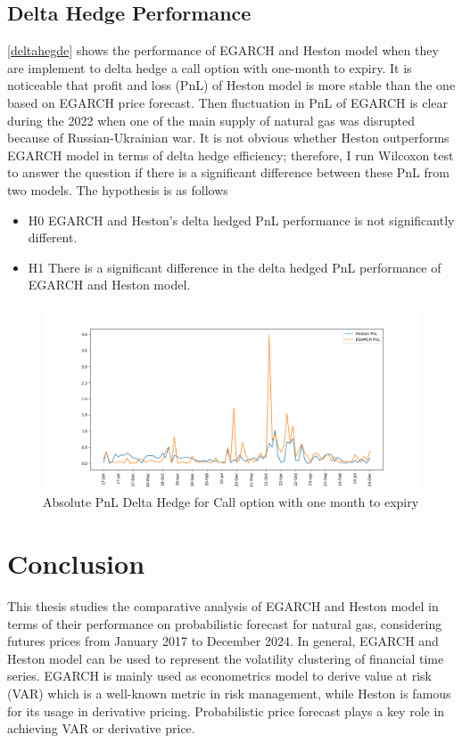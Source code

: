 \documentclass[12pt,a4paper]{article}
\newcommand\colorAutoref[1]{{\hypersetup{linkcolor=black}\autoref{#1}}}
\numberwithin{equation}{section}
\begin{document}
\subsection{Delta Hedge Performance}


\colorAutoref{deltahegde} shows the performance of EGARCH and Heston model when they are implement to delta hedge a call option with one-month to expiry. It is noticeable that profit and loss (PnL) of Heston model is more stable than the one based on EGARCH price forecast. Then fluctuation in PnL of EGARCH is clear during the 2022 when one of the main supply of natural gas was disrupted because of Russian-Ukrainian war. It is not obvious whether Heston outperforms EGARCH model in terms of delta hedge efficiency; therefore, I run Wilcoxon test to answer the question if there is a significant difference between these PnL from two models. The hypothesis is as follows

\begin{itemize}
\item H0 EGARCH and Heston's delta hedged PnL performance is not significantly different.
\item H1 There is a significant difference in the delta hedged PnL performance of EGARCH and Heston model.
\end{itemize}



\begin{figure}[h!] 
\includegraphics[scale=1,width=1\linewidth,height=0.4\textheight]{deltahedge_pnl.png}
\caption{Absolute PnL Delta Hedge for Call option with one month to expiry}
\label{deltahegde}
\end{figure}



\newpage
\section{Conclusion}
This thesis studies the comparative analysis of EGARCH and Heston model in terms of their performance on probabilistic forecast for natural gas, considering futures prices from January 2017 to December 2024. In general, EGARCH and Heston model can be used to represent the volatility clustering of financial time series.  EGARCH is mainly used as econometrics model to derive value at risk (VAR) which is a well-known metric in risk management, while Heston is famous for its usage in derivative pricing. Probabilistic price forecast plays a key role in achieving VAR or derivative price. 
\end{document}

